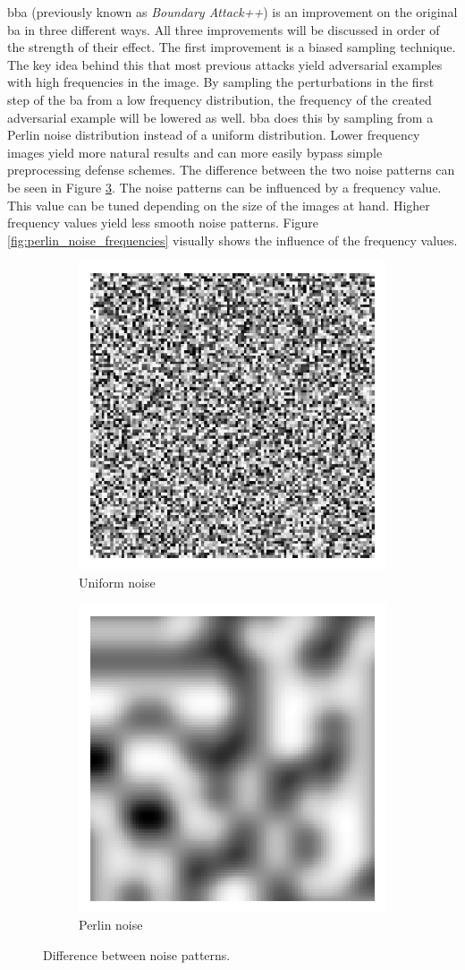 \gls{bba} \cite{brunner_guessing_2019} (previously known as \textit{Boundary Attack++}) is an improvement on the original \gls{ba} in three different ways. All three improvements will be discussed in order of the strength of their effect. The first improvement is a biased sampling technique. The key idea behind this that most previous attacks yield adversarial examples with high frequencies in the image. By sampling the perturbations in the first step of the \gls{ba} from a low frequency distribution, the frequency of the created adversarial example will be lowered as well. \gls{bba} does this by sampling from a Perlin noise \cite{perlin} distribution instead of a uniform distribution. Lower frequency images yield more natural results and can more easily bypass simple preprocessing defense schemes. The difference between the two noise patterns can be seen in Figure \ref{fig:noise_differences}. The noise patterns can be influenced by a frequency value. This value can be tuned depending on the size of the images at hand. Higher frequency values yield less smooth noise patterns. Figure \ref{fig:perlin_noise_frequencies} visually shows the influence of the frequency values.\\

\begin{figure}
\centering
\begin{subfigure}{.5\textwidth}
  \centering
  \includegraphics[width=.4\linewidth]{Images/gaussian_noise}
  \caption{Uniform noise}
  \label{fig:uniform_noise}
\end{subfigure}%
\begin{subfigure}{.5\textwidth}
  \centering
  \includegraphics[width=.4\linewidth]{Images/perlin_noise}
  \caption{Perlin noise}
  \label{fig:perlin_noise}
\end{subfigure}
\caption[Difference between noise patterns]{Difference between noise patterns.}
\label{fig:noise_differences}
\end{figure}

